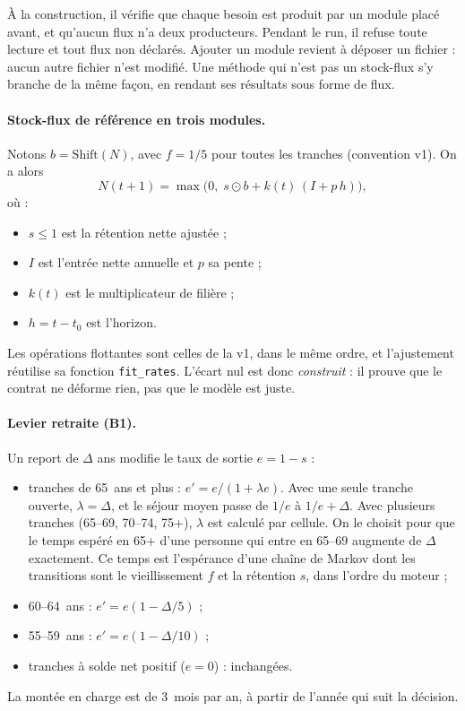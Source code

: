 À la construction, il vérifie que chaque besoin est produit par un module placé avant, et qu'aucun
flux n'a deux producteurs. Pendant le run, il refuse toute lecture et tout flux non déclarés. Ajouter
un module revient à déposer un fichier : aucun autre fichier n'est modifié. Une méthode qui n'est pas
un stock-flux s'y branche de la même façon, en rendant ses résultats sous forme de flux.

\paragraph{Stock-flux de référence en trois modules.} Notons $b = \text{Shift}(N)$, avec $f = 1/5$
pour toutes les tranches (convention v1). On a alors
\begin{equation}
N(t+1) = \max\!\bigl(0,\; s\odot b + k(t)\,(I + p\,h)\bigr),
\end{equation}
où :
\begin{itemize}
  \item $s \le 1$ est la rétention nette ajustée ;
  \item $I$ est l'entrée nette annuelle et $p$ sa pente ;
  \item $k(t)$ est le multiplicateur de filière ;
  \item $h = t - t_0$ est l'horizon.
\end{itemize}
Les opérations flottantes sont celles de la v1, dans le même ordre, et l'ajustement réutilise sa
fonction \texttt{fit\_rates}. L'écart nul est donc \emph{construit} : il prouve que le contrat ne
déforme rien, pas que le modèle est juste.

\paragraph{Levier retraite (B1).} Un report de $\Delta$ ans modifie le taux de sortie $e = 1-s$ :
\begin{itemize}
  \item tranches de 65~ans et plus : $e' = e/(1+\lambda e)$. Avec une seule tranche ouverte,
        $\lambda = \Delta$, et le séjour moyen passe de $1/e$ à $1/e + \Delta$. Avec plusieurs
        tranches (65--69, 70--74, 75+), $\lambda$ est calculé par cellule. On le choisit pour que le
        temps espéré en 65+ d'une personne qui entre en 65--69 augmente de $\Delta$ exactement. Ce
        temps est l'espérance d'une chaîne de Markov dont les transitions sont le vieillissement $f$ et
        la rétention $s$, dans l'ordre du moteur ;
  \item 60--64~ans : $e' = e(1-\Delta/5)$ ;
  \item 55--59~ans : $e' = e(1-\Delta/10)$ ;
  \item tranches à solde net positif ($e = 0$) : inchangées.
\end{itemize}
La montée en charge est de 3\suppose{}~mois par an, à partir de l'année qui suit la décision.

